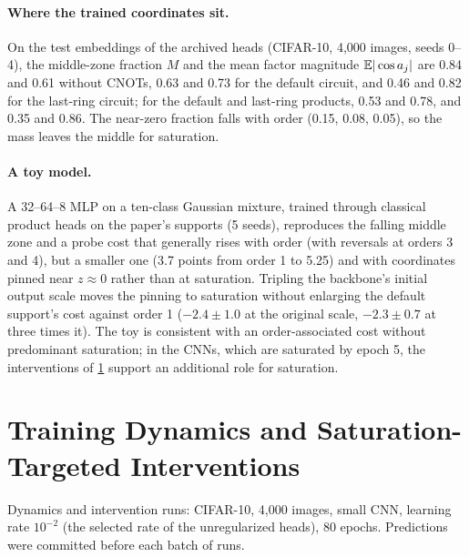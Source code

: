 \paragraph{Where the trained coordinates sit.} On the test embeddings of the archived heads (CIFAR-10,
4,000 images, seeds 0--4), the middle-zone fraction $M$ and the mean factor magnitude
$\mathbb{E}|\cos a_{j}|$ are 0.84 and 0.61 without CNOTs, 0.63 and 0.73 for the default circuit, and
0.46 and 0.82 for the last-ring circuit; for the default and last-ring products, 0.53 and 0.78, and 0.35
and 0.86. The near-zero fraction falls with order (0.15, 0.08, 0.05), so the mass leaves the middle
for saturation.

\paragraph{A toy model.} A 32--64--8 MLP on a ten-class Gaussian mixture, trained through classical
product heads on the paper's supports (5 seeds), reproduces the falling middle zone and a probe cost
that generally rises with order (with reversals at orders 3 and 4), but a smaller one (3.7 points from order 1 to 5.25) and with coordinates pinned
near $z\approx0$ rather than at saturation. Tripling the backbone's initial output scale moves the pinning to saturation without enlarging the default support's cost against order 1 ($-2.4\pm1.0$ at the original scale, $-2.3\pm0.7$ at three times it). The toy is consistent with an order-associated cost without predominant saturation; in the CNNs, which are saturated by epoch 5, the interventions of \cref{app:dynamics} support an additional role for saturation.

\section{Training Dynamics and Saturation-Targeted Interventions}
\label{app:dynamics}

Dynamics and intervention runs: CIFAR-10, 4,000 images, small CNN, learning rate $10^{-2}$ (the selected rate of the
unregularized heads), 80 epochs. Predictions were committed before each batch of runs.

